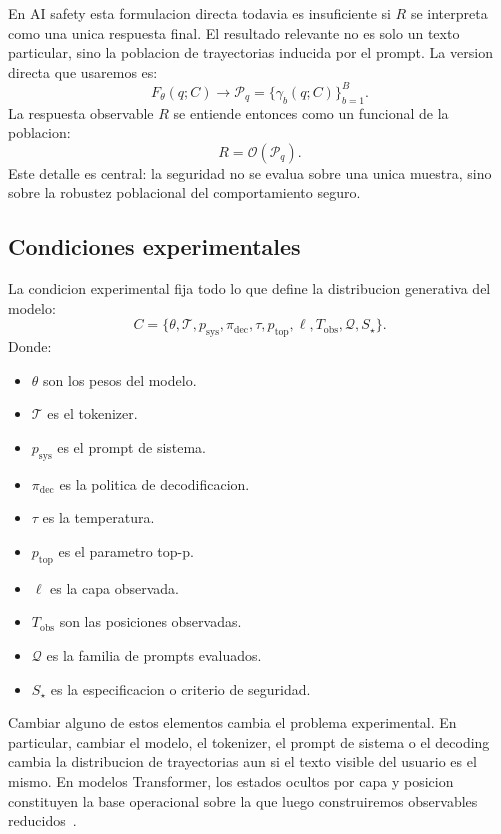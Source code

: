 \documentclass[10pt,twocolumn]{article}
\newcommand{\traj}{\gamma}
\newcommand{\rollouts}{\mathcal{P}}
\newcommand{\obs}{\mathcal{O}}
\begin{document}
En AI safety esta formulacion directa todavia es insuficiente si \(R\) se interpreta como una unica respuesta final. El resultado relevante no es solo un texto particular, sino la poblacion de trayectorias inducida por el prompt. La version directa que usaremos es:
\[
F_{\theta}(q;C)
\longrightarrow
\rollouts_q
=
\{\traj_b(q;C)\}_{b=1}^{B}.
\]
La respuesta observable \(R\) se entiende entonces como un funcional de la poblacion:
\[
R=\obs(\rollouts_q).
\]
Este detalle es central: la seguridad no se evalua sobre una unica muestra, sino sobre la robustez poblacional del comportamiento seguro.


\subsection{Condiciones experimentales}

La condicion experimental fija todo lo que define la distribucion generativa del modelo:
\[
C=
\{\theta,\mathcal{T},p_{\mathrm{sys}},\pi_{\mathrm{dec}},
\tau,p_{\mathrm{top}},\ell,T_{\mathrm{obs}},\mathcal{Q},S_\star\}.
\]
Donde:

\begin{itemize}
    \item \(\theta\) son los pesos del modelo.
    \item \(\mathcal{T}\) es el tokenizer.
    \item \(p_{\mathrm{sys}}\) es el prompt de sistema.
    \item \(\pi_{\mathrm{dec}}\) es la politica de decodificacion.
    \item \(\tau\) es la temperatura.
    \item \(p_{\mathrm{top}}\) es el parametro top-p.
    \item \(\ell\) es la capa observada.
    \item \(T_{\mathrm{obs}}\) son las posiciones observadas.
    \item \(\mathcal{Q}\) es la familia de prompts evaluados.
    \item \(S_\star\) es la especificacion o criterio de seguridad.
\end{itemize}

Cambiar alguno de estos elementos cambia el problema experimental. En particular, cambiar el modelo, el tokenizer, el prompt de sistema o el decoding cambia la distribucion de trayectorias aun si el texto visible del usuario es el mismo. En modelos Transformer, los estados ocultos por capa y posicion constituyen la base operacional sobre la que luego construiremos observables reducidos~\cite{vaswani2017attention}.
\end{document}
